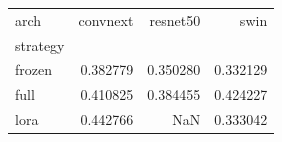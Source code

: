 \begin{tabular}{lrrr}
\toprule
arch & convnext & resnet50 & swin \\
strategy &  &  &  \\
\midrule
frozen & 0.382779 & 0.350280 & 0.332129 \\
full & 0.410825 & 0.384455 & 0.424227 \\
lora & 0.442766 & NaN & 0.333042 \\
\bottomrule
\end{tabular}
